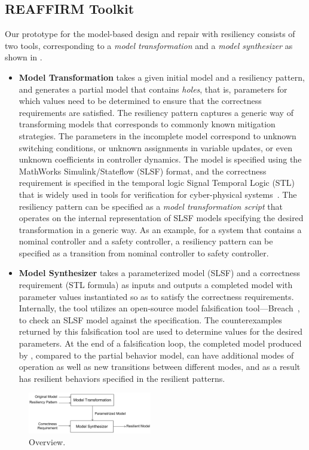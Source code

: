 \subsection{REAFFIRM Toolkit}
%
Our \toolreaffirm prototype for the model-based design and repair with resiliency consists of two tools, corresponding to a \emph{model transformation} and a \emph{model synthesizer} as shown in .
%
\begin{itemize}[leftmargin= 2 em]
	\item \textbf{Model Transformation} takes a given initial model and a resiliency pattern, and generates a partial model that contains \emph{holes}, that is, parameters for which values need to be determined to ensure that the correctness requirements are satisfied. The resiliency pattern captures a generic way of transforming models that corresponds to commonly known mitigation strategies. The parameters in the incomplete model correspond to unknown switching conditions, or unknown assignments in variable updates, or even unknown coefficients in controller dynamics. The model is specified using the MathWorks Simulink/Stateflow (SLSF) format, and the correctness requirement is specified in the temporal logic Signal Temporal Logic (STL) that is widely used in tools for verification for cyber-physical systems~\cite{maler2004monitoring}. The resiliency pattern can be specified as a \emph{model transformation script} that operates on the internal representation of SLSF models specifying the desired transformation in a generic way. As an example, for a system that contains a nominal controller and a safety controller, a resiliency pattern can be specified as a transition from nominal controller to safety controller.
%
\item \textbf{Model Synthesizer} takes a parameterized model (SLSF) and a correctness requirement (STL formula) as inputs and outputs a completed model with parameter values instantiated so as to satisfy the correctness requirements.  Internally, the tool utilizes an open-source model falsification tool---Breach~\cite{donze2010breach}, to check an SLSF model against the specification. The counterexamples returned by this falsification tool are used to determine values for the desired parameters. At the end of a falsification loop, the completed model produced by \toolreaffirm, compared to the partial behavior model, can have additional modes of operation as well as new transitions between different modes, and as a result has resilient behaviors specified in the resilient patterns.
\end{itemize}
%
%
%
%
\begin{figure}[t!]%
	\centering%
    \includegraphics[width=0.48\textwidth]{image/overview}%
	\caption{\toolreaffirm Overview.}%
\end{figure}%
%
%

